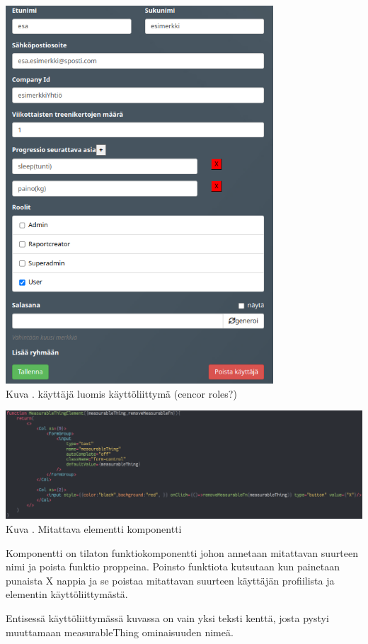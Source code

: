 \bigskip
\includegraphics[width = 10cm]{src/public/oppar/adminUserProfilePost.png}\\
Kuva \getImgCount {}. käyttäjä luomis käyttöliittymä (cencor roles?)
\bigskip


\includegraphics[width = 15cm]{src/public/oppar/measurableElementComponent.png}\\
Kuva \getImgCount {}. Mitattava elementti komponentti
\medskip

Komponentti on tilaton funktiokomponentti johon annetaan mitattavan suurteen nimi ja poista funktio proppeina.
Poinsto funktiota kutsutaan kun painetaan punaista X nappia ja se poistaa mitattavan suurteen käyttäjän profiilista ja elementin käyttöliittymästä.
\medskip


Entisessä käyttöliittymässä kuvassa \nextImageCount {} on vain yksi teksti kenttä, josta pystyi muuttamaan measurableThing ominaisuuden nimeä.

